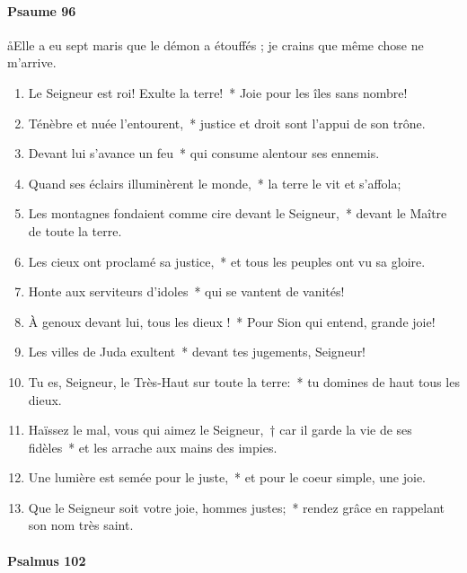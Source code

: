 \documentclass[twoside]{article}
\begin{document}
\begin{paracol}[1]{2}
\switchcolumn

\paragraph{Psaume 96}
\aa Elle a eu sept maris que le démon a étouffés ; je crains que même chose ne m’arrive.


\begin{enumerate}[wide, itemsep=0mm, labelwidth=!, labelindent=0pt, label=\color{gregoriocolor}\theenumi]
\item Le Seigneur est roi! Exulte la terre!~* Joie pour les îles sans nombre!
\item Ténèbre et nuée l'entourent,~* justice et droit sont l'appui de son trône.
\item Devant lui s'avance un feu~* qui consume alentour ses ennemis.
\item Quand ses éclairs illuminèrent le monde,~* la terre le vit et s'affola;
\item Les montagnes fondaient comme cire devant le Seigneur,~* devant le Maître de toute la terre.
\item Les cieux ont proclamé sa justice,~* et tous les peuples ont vu sa gloire.
\item Honte aux serviteurs d'idoles~* qui se vantent de vanités! 
\item À genoux devant lui, tous les dieux !~* Pour Sion qui entend, grande joie!
\item Les villes de Juda exultent~* devant tes jugements, Seigneur!
\item Tu es, Seigneur, le Très-Haut sur toute la terre:~* tu domines de haut tous les dieux.
\item Haïssez le mal, vous qui aimez le Seigneur,~† car il garde la vie de ses fidèles~* et les arrache aux mains des impies.
\item Une lumière est semée pour le juste,~* et pour le coeur simple, une joie.
\item Que le Seigneur soit votre joie, hommes justes;~* rendez grâce en rappelant son nom très saint.
\end{enumerate}
\pagebreak
\switchcolumn*

\paragraph{Psalmus 102}



\end{paracol}
\end{document}
